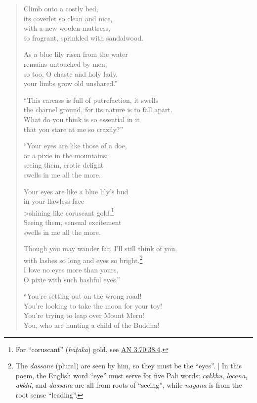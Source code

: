 \documentclass[12pt,openany]{book}%
\begin{document}
\begin{verse}
Climb onto a costly bed, \\
its coverlet so clean and nice, \\
with a new woolen mattress, \\
so fragrant, sprinkled with sandalwood. 

As a blue lily risen from the water \\
remains untouched by men, \\
so too, O chaste and holy lady, \\
your limbs grow old unshared.” 

“This carcass is full of putrefaction, it swells \\
the charnel ground, for its nature is to fall apart. \\
What do you think is so essential in it \\
that you stare at me so crazily?” 

“Your eyes are like those of a doe, \\
or a pixie in the mountains; \\
seeing them, erotic delight \\
swells in me all the more. 

Your eyes are like a blue lily’s bud \\
in your flawless face \\>shining like coruscant gold.\footnote{For “coruscant” (\textit{\textsanskrit{hāṭaka}}) gold, see \href{https://suttacentral.net/an3.70/en/sujato\#38.4}{AN 3.70:38.4}. } \\
Seeing them, sensual excitement \\
swells in me all the more. 

Though you may wander far, I’ll still think of you, \\
with lashes so long and eyes so bright.\footnote{The \textit{dassane} (plural) are seen by him, so they must be the “eyes”. | In this poem, the English word “eye” must serve for five Pali words: \textit{cakkhu}, \textit{locana}, \textit{akkhi}, and \textit{dassana} are all from roots of “seeing”, while \textit{nayana} is from the root sense “leading”. } \\
I love no eyes more than yours, \\
O pixie with such bashful eyes.” 

“You’re setting out on the wrong road! \\
You’re looking to take the moon for your toy! \\
You’re trying to leap over Mount Meru! \\
You, who are hunting a child of the Buddha! 


\end{verse}
\end{document}
